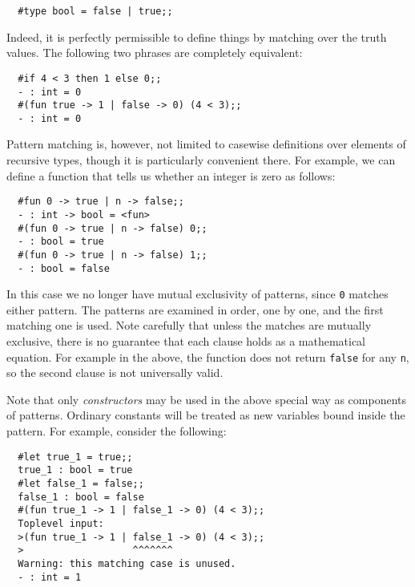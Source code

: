 \begin{boxed}\begin{verbatim}
  #type bool = false | true;;
\end{verbatim}\end{boxed}

Indeed, it is perfectly permissible to define things by matching over the truth
values. The following two phrases are completely equivalent:

\begin{boxed}\begin{verbatim}
  #if 4 < 3 then 1 else 0;;
  - : int = 0
  #(fun true -> 1 | false -> 0) (4 < 3);;
  - : int = 0
\end{verbatim}\end{boxed}

Pattern matching is, however, not limited to casewise definitions over elements
of recursive types, though it is particularly convenient there. For example, we
can define a function that tells us whether an integer is zero as follows:

\begin{boxed}\begin{verbatim}
  #fun 0 -> true | n -> false;;
  - : int -> bool = <fun>
  #(fun 0 -> true | n -> false) 0;;
  - : bool = true
  #(fun 0 -> true | n -> false) 1;;
  - : bool = false
\end{verbatim}\end{boxed}

In this case we no longer have mutual exclusivity of patterns, since {\tt 0}
matches either pattern. The patterns are examined in order, one by one, and the
first matching one is used. Note carefully that unless the matches are mutually
exclusive, there is no guarantee that each clause holds as a mathematical
equation. For example in the above, the function does not return {\tt false}
for any {\tt n}, so the second clause is not universally valid.

Note that only {\em constructors} may be used in the above special way as
components of patterns. Ordinary constants will be treated as new variables
bound inside the pattern. For example, consider the following:

\begin{boxed}\begin{verbatim}
  #let true_1 = true;;
  true_1 : bool = true
  #let false_1 = false;;
  false_1 : bool = false
  #(fun true_1 -> 1 | false_1 -> 0) (4 < 3);;
  Toplevel input:
  >(fun true_1 -> 1 | false_1 -> 0) (4 < 3);;
  >                   ^^^^^^^
  Warning: this matching case is unused.
  - : int = 1
\end{verbatim}\end{boxed}

